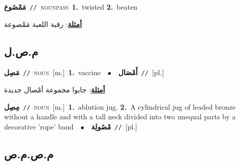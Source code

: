 \documentclass[10pt,a4paper,twoside]{article} %
\begin{document}
\begin{multicols}{2}
{\setlength\topsep{0pt}\textbf{\foreignlanguage{arabic}{مَمْصُوع}}\ {\color{gray}\texttt{//}\color{black}}\ \textsc{noun\textunderscore pass}\ \textbf{1.}~twisted  \textbf{2.}~beaten\  \begin{flushright}\color{gray}\foreignlanguage{arabic}{\textbf{\underline{\foreignlanguage{arabic}{أمثلة}}}: رقبة اللعبة مَمْصوعة}\end{flushright}\color{black}} \vspace{2mm}

\vspace{-3mm}
\subsection*{\color{blue}\foreignlanguage{arabic}{م.ص.ل}\color{blue}{}} 

{\setlength\topsep{0pt}\textbf{\foreignlanguage{arabic}{مَصِل}}\ {\color{gray}\texttt{//}\color{black}}\ \textsc{noun}\ [m.]\ \textbf{1.}~vaccine\ \ $\bullet$\ \ \setlength\topsep{0pt}\textbf{\foreignlanguage{arabic}{أَمْصَال}}\ {\color{gray}\texttt{//}\color{black}}\ [pl.]\  \begin{flushright}\color{gray}\foreignlanguage{arabic}{\textbf{\underline{\foreignlanguage{arabic}{أمثلة}}}: جابوا مجموعة أمْصال جديدة}\end{flushright}\color{black}} \vspace{2mm}

{\setlength\topsep{0pt}\textbf{\foreignlanguage{arabic}{مِصِل}}\ {\color{gray}\texttt{//}\color{black}}\ \textsc{noun}\ [m.]\ \textbf{1.}~ablution jug.  \textbf{2.}~A cylindrical jug of leaded bronze without a handle and with a tall neck divided into two unequal parts by a decorative 'rope' band\ \ $\bullet$\ \ \setlength\topsep{0pt}\textbf{\foreignlanguage{arabic}{مْصُولِة}}\ {\color{gray}\texttt{//}\color{black}}\ [pl.]\ } \vspace{2mm}

\vspace{-3mm}
\subsection*{\color{blue}\foreignlanguage{arabic}{م.ص.م.ص}\color{blue}{}} 


\end{multicols}
\end{document}
